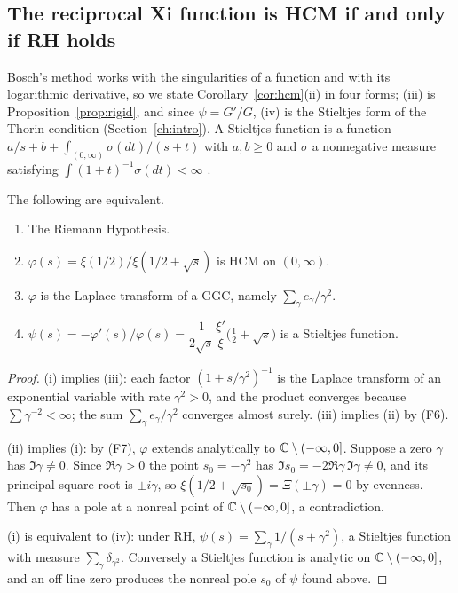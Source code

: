 \subsection{The reciprocal Xi function is HCM if and only if RH holds}\label{bh:sec:main}

Bosch's method works with the singularities of a function and with its logarithmic derivative, so we state Corollary~\ref{cor:hcm}(ii) in four forms; (iii) is Proposition~\ref{prop:rigid}, and since $\psi=G'/G$, (iv) is the Stieltjes form of the Thorin condition (Section~\ref{ch:intro}). A Stieltjes function is a function $a/s+b+\int_{(0,\infty)}\sigma(dt)/(s+t)$ with $a,b\ge0$ and $\sigma$ a nonnegative measure satisfying $\int(1+t)^{-1}\sigma(dt)<\infty$ \cite[Definition 2.1]{boSSV}.

\begin{theorem}\label{bh:thm:main}
The following are equivalent.
\begin{enumerate}
\item[(i)] The Riemann Hypothesis.
\item[(ii)] $\varphi(s)=\xi(1/2)/\xi(1/2+\sqrt{s})$ is HCM on $(0,\infty)$.
\item[(iii)] $\varphi$ is the Laplace transform of a GGC, namely $\sum_\gamma e_\gamma/\gamma^2$.
\item[(iv)] $\psi(s)=-\varphi'(s)/\varphi(s)=\dfrac{1}{2\sqrt{s}}\dfrac{\xi'}{\xi}\bigl(\tfrac12+\sqrt{s}\bigr)$ is a Stieltjes function.
\end{enumerate}
\end{theorem}

\begin{proof}
(i) implies (iii): each factor $(1+s/\gamma^2)^{-1}$ is the Laplace transform of an exponential variable with rate $\gamma^2>0$, and the product converges because $\sum\gamma^{-2}<\infty$; the sum $\sum_\gamma e_\gamma/\gamma^2$ converges almost surely. (iii) implies (ii) by (F6).

(ii) implies (i): by (F7), $\varphi$ extends analytically to $\mathbb{C}\setminus(-\infty,0]$. Suppose a zero $\gamma$ has $\Im\gamma\ne0$. Since $\Re\gamma>0$ the point $s_0=-\gamma^2$ has $\Im s_0=-2\Re\gamma\,\Im\gamma\ne0$, and its principal square root is $\pm i\gamma$, so $\xi(1/2+\sqrt{s_0})=\Xi(\pm\gamma)=0$ by evenness. Then $\varphi$ has a pole at a nonreal point of $\mathbb{C}\setminus(-\infty,0]$, a contradiction.

(i) is equivalent to (iv): under RH, $\psi(s)=\sum_\gamma 1/(s+\gamma^2)$, a Stieltjes function with measure $\sum_\gamma\delta_{\gamma^2}$. Conversely a Stieltjes function is analytic on $\mathbb{C}\setminus(-\infty,0]$, and an off line zero produces the nonreal pole $s_0$ of $\psi$ found above.
\end{proof}

